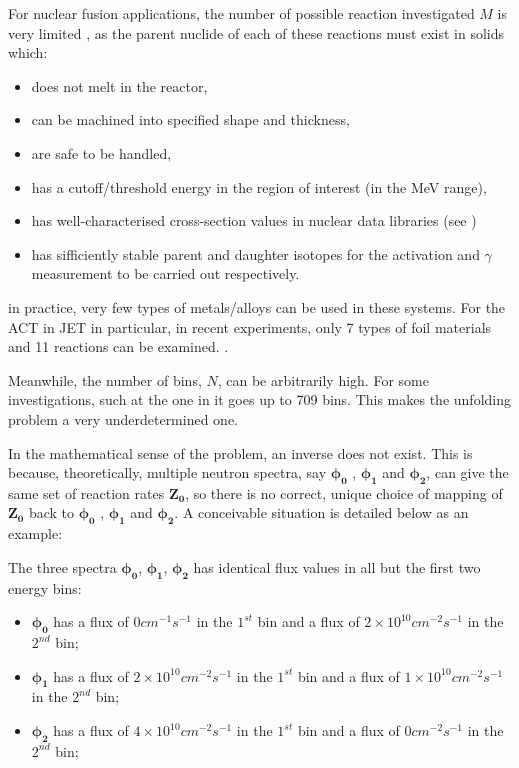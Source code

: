 \documentclass[a4paper, 12pt]{article}
\newcommand{\ve}[1]{\boldsymbol{#1}}
\begin{document}
For nuclear fusion applications, the number of possible reaction investigated $M$ is very limited \cite{MaterialSelection}, as the parent nuclide of each of these reactions must exist in solids which:
\begin{itemize}
    \item does not melt in the reactor,
    \item can be machined into specified shape and thickness,
    \item are safe to be handled,
    \item has a cutoff/threshold energy in the region of interest (in the MeV range),
    \item has well-characterised cross-section values in nuclear data libraries (see \cite{MaterialSelectionASTM})
    \item has sifficiently stable parent and daughter isotopes for the activation and $\gamma$ measurement to be carried out respectively.
\end{itemize}
in practice, very few types of metals/alloys can be used in these systems. For the ACT in JET in particular, in recent experiments, only 7 types of foil materials and 11 reactions can be examined. \cite{LWP_LTIS}.

Meanwhile, the number of bins, $N$, can be arbitrarily high. For some investigations, such at the one in \cite{EmbargoPaper_LWP} it goes up to 709 bins. 
This makes the unfolding problem a very underdetermined one.

In the mathematical sense of the problem, an inverse does not exist. This is because, theoretically, multiple neutron spectra, say $\ve{\phi_0}$ , $\ve{\phi_1}$ and $\ve{\phi_2}$, can give the same set of reaction rates $\ve{Z_0}$, so there is no correct, unique choice of mapping of $\ve{Z_0}$ back to $\ve{\phi_0}$ , $\ve{\phi_1}$ and $\ve{\phi_2}$. \cite{BirminghamUnfolding} A conceivable situation is detailed below as an example:

The three spectra $\ve{\phi_0}$, $\ve{\phi_1}$, $\ve{\phi_2}$ has identical flux values in all but the first two energy bins:

\begin{itemize}
    \item $\ve{\phi_0}$ has a flux of $0                cm^{-1} s^{-1}$ in the $1^{st}$ bin and a flux of $2 \times 10^{10} cm^{-2} s^{-1}$ in the $2^{nd}$ bin;
    \item $\ve{\phi_1}$ has a flux of $2 \times 10^{10} cm^{-2} s^{-1}$ in the $1^{st}$ bin and a flux of $1 \times 10^{10} cm^{-2} s^{-1}$ in the $2^{nd}$ bin;
    \item $\ve{\phi_2}$ has a flux of $4 \times 10^{10} cm^{-2} s^{-1}$ in the $1^{st}$ bin and a flux of $0                cm^{-2} s^{-1}$ in the $2^{nd}$ bin;
\end{itemize}
\end{document}
